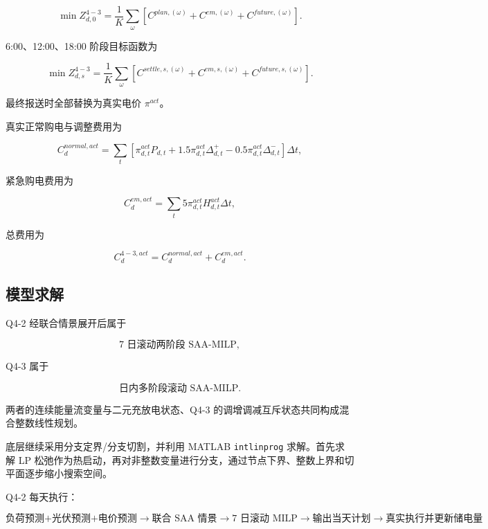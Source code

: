 \begin{equation}
\min Z_{d,0}^{4-3}
=
\frac1K
\sum_\omega
\left[
C^{plan,(\omega)}
+
C^{em,(\omega)}
+
C^{future,(\omega)}
\right].
\end{equation}

6:00、12:00、18:00 阶段目标函数为

\begin{equation}
\min Z_{d,s}^{4-3}
=
\frac1K
\sum_\omega
\left[
C^{settle,s,(\omega)}
+
C^{em,s,(\omega)}
+
C^{future,s,(\omega)}
\right].
\end{equation}

最终报送时全部替换为真实电价 \(\pi^{act}\)。

真实正常购电与调整费用为

\begin{equation}
C_d^{normal,act}
=
\sum_t
\left[
\pi_{d,t}^{act}P_{d,t}
+
1.5\pi_{d,t}^{act}\Delta^+_{d,t}
-
0.5\pi_{d,t}^{act}\Delta^-_{d,t}
\right]\Delta t,
\end{equation}

紧急购电费用为

\begin{equation}
C_d^{em,act}
=
\sum_t
5\pi_{d,t}^{act}
H_{d,t}^{act}\Delta t,
\end{equation}

总费用为

\begin{equation}
C_d^{4-3,act}
=
C_d^{normal,act}
+
C_d^{em,act}.
\end{equation}

\subsection{模型求解}

Q4-2 经联合情景展开后属于

\[
\boxed{\text{7 日滚动两阶段 SAA-MILP}},
\]

Q4-3 属于

\[
\boxed{\text{日内多阶段滚动 SAA-MILP}}.
\]

两者的连续能量流变量与二元充放电状态、Q4-3 的调增调减互斥状态共同构成混合整数线性规划。

底层继续采用分支定界/分支切割，并利用 MATLAB \texttt{intlinprog} 求解。首先求解 LP 松弛作为热启动，再对非整数变量进行分支，通过节点下界、整数上界和切平面逐步缩小搜索空间。

Q4-2 每天执行：

\[
\boxed{
\text{负荷预测+光伏预测+电价预测}
\rightarrow
\text{联合 SAA 情景}
\rightarrow
\text{7 日滚动 MILP}
\rightarrow
\text{输出当天计划}
\rightarrow
\text{真实执行并更新储电量}
}
\]

